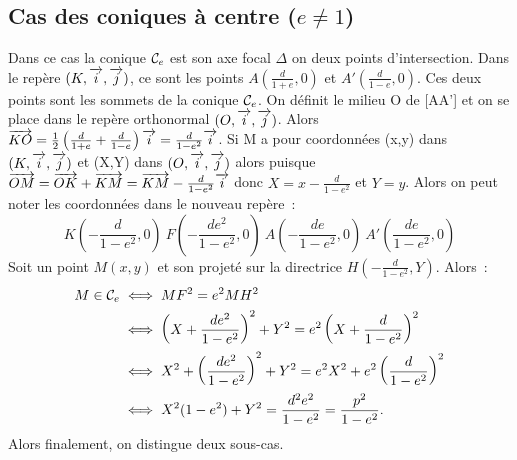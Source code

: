 \subsection{Cas des coniques à centre (\(e\neq 1\))}
Dans ce cas la conique \(\mathcal{C}_{e}\) est son axe focal \(\Delta\) on deux points 
d'intersection. Dans le repère \((K,\overrightarrow{i},\overrightarrow{j})\), ce sont les points 
\(A(\frac{d}{1+e},0)\) et \(A'(\frac{d}{1-e},0)\). Ces deux points sont les 
sommets de la conique \(\mathcal{C}_{e}\). On définit le milieu O de [AA'] et on se 
place dans le repère orthonormal \((O,\overrightarrow{i},\overrightarrow{j})\). Alors 
\(\overrightarrow{KO}=\frac{1}{2}\left(\frac{d}{1+e}+\frac{d}{1-e}\right)\overrightarrow{i}=\frac{d}{1-e^2}\overrightarrow{i}\). 
Si M a pour coordonnées (x,y) dans \((K,\overrightarrow{i},\overrightarrow{j})\) et (X,Y) dans \((O,\overrightarrow{i},\overrightarrow{j})\) alors 
puisque \(\overrightarrow{OM}=\overrightarrow{OK}+\overrightarrow{KM}=\overrightarrow{KM}-\frac{d}{1-e^2}\overrightarrow{i}\) donc 
\(X=x-\frac{d}{1-e^2}\) et \(Y=y\). Alors on peut noter les coordonnées dans le 
nouveau repère~:
\begin{equation}
  K\left(-\frac{d}{1-e^2},0\right) \ F\left(-\frac{de^2}{1-e^2},0\right) \ 
  A\left(-\frac{de}{1-e^2},0\right) \ A'\left(\frac{de}{1-e^2},0\right)
\end{equation}
Soit un point \(M(x,y)\) et son projeté sur la directrice 
\(H\left(-\frac{d}{1-e^2},Y\right)\). Alors~:
\begin{align}
  M \in \mathcal{C}_{e} &\iff MF^2=e^2 MH^2\\
                &\iff \left(X+\frac{de^2}{1-e^2}\right)^2+Y^2=e^2 
                \left(X+\frac{d}{1-e^2}\right)^2\\
                &\iff X^2+\left(\frac{de^2}{1-e^2}\right)^2+Y^2=e^2 
                X^2+e^2\left(\frac{d}{1-e^2}\right)^2\\
                &\iff X^2(1-e^2)+Y^2=\frac{d^2e^2}{1-e^2}=\frac{p^2}{1-e^2}.
\end{align}
Alors finalement, on distingue deux sous-cas.

